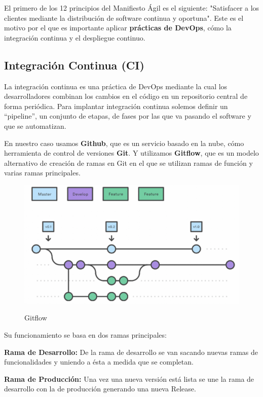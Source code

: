 \documentclass[12pt,twoside,titlepage]{report}
\begin{document}
El primero de los 12 principios del Manifiesto Ágil es el siguiente: "Satisfacer a los clientes mediante la distribución de software continua y oportuna". Este es el motivo por el que es importante aplicar \textbf{prácticas de DevOps}, cómo la integración continua y el despliegue continuo.

\subsection{Integración Continua (CI)}

La integración continua es una práctica de DevOps mediante la cual los desarrolladores combinan los cambios en el código en un repositorio central de forma periódica. Para implantar integración continua solemos definir un ``pipeline'', un conjunto de etapas, de fases por las que va pasando el software y que se automatizan. 

En nuestro caso usamos \textbf{Github}, que es un servicio basado en la nube, cómo herramienta de control de versiones \textbf{Git}. Y utilizamos \textbf{Gitflow}, que es un modelo alternativo de creación de ramas en Git en el que se utilizan ramas de función y varias ramas principales.

\begin{figure}[H]
    \centering
    \includegraphics[scale=0.58]{DevOps/Gitflow}
    \label{fig:Gitflow}
    \caption{Gitflow}
\end{figure}

Su funcionamiento se basa en dos ramas principales: 

\begin{compactitem}
    \item \textbf{Rama de Desarrollo:} De la rama de desarrollo se van sacando nuevas ramas de funcionalidades y uniendo a ésta a medida que se completan.
    \item \textbf{Rama de Producción:} Una vez una nueva versión está lista se une la rama de desarrollo con la de producción generando una nueva Release.
\end{compactitem}
\end{document}
